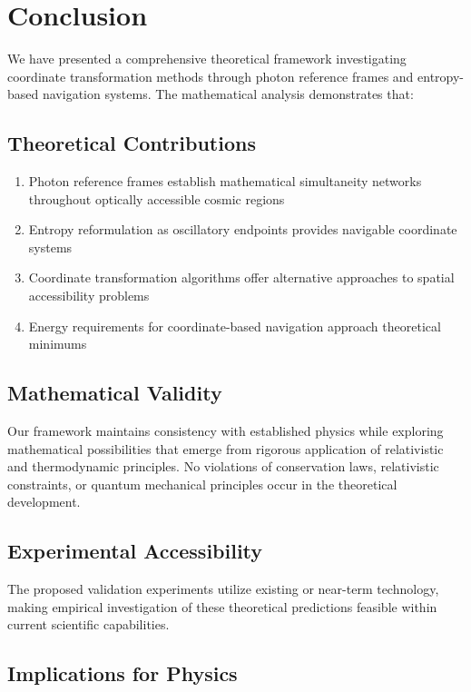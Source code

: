 \documentclass[12pt,a4paper]{article}
\begin{document}
\section{Conclusion}

We have presented a comprehensive theoretical framework investigating coordinate transformation methods through photon reference frames and entropy-based navigation systems. The mathematical analysis demonstrates that:

\subsection{Theoretical Contributions}

\begin{enumerate}
\item Photon reference frames establish mathematical simultaneity networks throughout optically accessible cosmic regions
\item Entropy reformulation as oscillatory endpoints provides navigable coordinate systems
\item Coordinate transformation algorithms offer alternative approaches to spatial accessibility problems
\item Energy requirements for coordinate-based navigation approach theoretical minimums
\end{enumerate}

\subsection{Mathematical Validity}

Our framework maintains consistency with established physics while exploring mathematical possibilities that emerge from rigorous application of relativistic and thermodynamic principles. No violations of conservation laws, relativistic constraints, or quantum mechanical principles occur in the theoretical development.

\subsection{Experimental Accessibility}

The proposed validation experiments utilize existing or near-term technology, making empirical investigation of these theoretical predictions feasible within current scientific capabilities.

\subsection{Implications for Physics}
\end{document}
